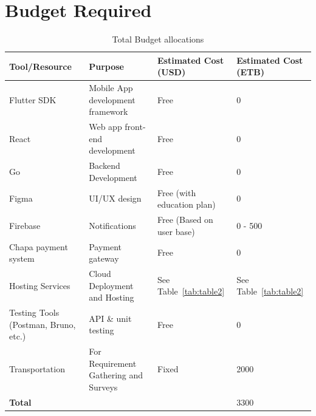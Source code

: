 \documentclass[12pt]{report}
\begin{document}
\section{Budget Required}

\begin{table}[H]
	\begin{center}
		\begin{tabular}{|p{3cm}|p{5cm}|p{2.5cm}|p{2.5cm}||}
			\hline
			\textbf{Tool/Resource}               & \textbf{Purpose}                      & \textbf{Estimated Cost (USD)} & \textbf{Estimated Cost (ETB)} \\
			\hline
			Flutter SDK                          & Mobile App development framework      & Free                          & 0                             \\
			\hline
			React                                & Web app front-end development         & Free                          & 0                             \\
			\hline
			Go                                   & Backend Development                   & Free                          & 0                             \\
			\hline
			Figma                                & UI/UX design                          & Free (with education plan)    & 0                             \\
			\hline
			Firebase                             & Notifications                         & Free (Based on user base)     & 0 - 500                       \\
			\hline
			Chapa payment system                 & Payment gateway                       & Free                          & 0                             \\
			\hline
			Hosting Services                     & Cloud Deployment and Hosting          & See Table~\ref{tab:table2}    & See Table~\ref{tab:table2}    \\
			\hline
			Testing Tools (Postman, Bruno, etc.) & API \& unit testing                   & Free                          & 0                             \\
			\hline
			Transportation                       & For Requirement Gathering and Surveys & Fixed                         & 2000                          \\
			\hline
			\textbf{Total}                       &                                       &                               & 3300                          \\
			\hline
			\hline
		\end{tabular}
		\caption{Total Budget allocations}\label{tab:table1}
	\end{center}
\end{table}
\end{document}
